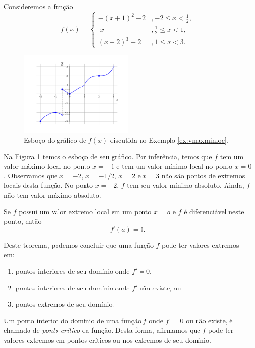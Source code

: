 \begin{ex}\label{ex:vmaxminloc}
  Consideremos a função
  \begin{equation}
    f(x) = \left\{
      \begin{array}{ll}
        -(x+1)^2-2 &, -2\leq x < \frac{1}{2},\\
        |x| &, \frac{1}{2} \leq x < 1,\\
        (x-2)^3+2 &, 1\leq x < 3.
      \end{array}
\right.
\end{equation}

  \begin{figure}[H]
    \centering
    \includegraphics[width=0.5\textwidth]{./cap_apderiv/dados/fig_ex_vmaxminloc/fig_f}
    \caption{Esboço do gráfico de $f(x)$ discutida no Exemplo \ref{ex:vmaxminloc}.}
    \label{fig:ex_vmaxminloc}
  \end{figure}
  
Na Figura \ref{fig:ex_vmaxminloc} temos o esboço de seu gráfico. Por inferência, temos que $f$ tem um valor máximo local no ponto $x=-1$ e tem um valor mínimo local no ponto $x=0$. Observamos que $x=-2$, $x=-1/2$, $x=2$ e $x=3$ não são pontos de extremos locais desta função. No ponto $x=-2$, $f$ tem seu valor mínimo absoluto. Ainda, $f$ não tem valor máximo absoluto.
\end{ex}

\begin{teo}
  Se $f$ possui um valor extremo local em um ponto $x=a$ e $f$ é diferenciável neste ponto, então
  \begin{equation}
    f'(a) = 0.
  \end{equation}
\end{teo}

Deste teorema, podemos concluir que uma função $f$ pode ter valores extremos em:
\begin{enumerate}
\item pontos interiores de seu domínio onde $f' = 0$,
\item pontos interiores de seu domínio onde $f'$ não existe, ou
\item pontos extremos de seu domínio.
\end{enumerate}
Um ponto interior do domínio de uma função $f$ onde $f'=0$ ou não existe, é chamado de \emph{ponto crítico} da função. Desta forma, afirmamos que $f$ pode ter valores extremos em pontos críticos ou nos extremos de seu domínio.

